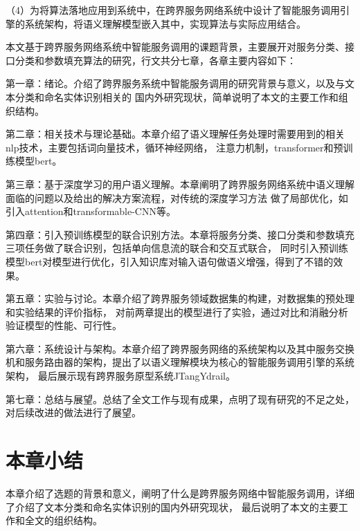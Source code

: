 （4）为将算法落地应用到系统中，在跨界服务网络系统中设计了智能服务调用引擎的系统架构，将语义理解模型嵌入其中，实现算法与实际应用结合。

本文基于跨界服务网络系统中智能服务调用的课题背景，主要展开对服务分类、接口分类和参数填充算法的研究，行文共分七章，各章主要内容如下：

第一章：绪论。介绍了跨界服务系统中智能服务调用的研究背景与意义，以及与文本分类和命名实体识别相关的
国内外研究现状，简单说明了本文的主要工作和组织结构。

第二章：相关技术与理论基础。本章介绍了语义理解任务处理时需要用到的相关nlp技术，主要包括词向量技术，循环神经网络，
注意力机制，transformer和预训练模型bert。

第三章：基于深度学习的用户语义理解。本章阐明了跨界服务网络系统中语义理解面临的问题以及给出的解决方案流程，对传统的深度学习方法
做了局部优化，如引入attention和transformable-CNN等。

第四章：引入预训练模型的联合识别方法。本章将服务分类、接口分类和参数填充三项任务做了联合识别，包括单向信息流的联合和交互式联合，
同时引入预训练模型bert对模型进行优化，引入知识库对输入语句做语义增强，得到了不错的效果。

第五章：实验与讨论。本章介绍了跨界服务领域数据集的构建，对数据集的预处理和实验结果的评价指标，
对前两章提出的模型进行了实验，通过对比和消融分析验证模型的性能、可行性。

第六章：系统设计与架构。本章介绍了跨界服务网络的系统架构以及其中服务交换机和服务路由器的架构，提出了以语义理解模块为核心的智能服务调用引擎的系统架构，
最后展示现有跨界服务原型系统JTangYdrail。

第七章：总结与展望。总结了全文工作与现有成果，点明了现有研究的不足之处，对后续改进的做法进行了展望。

\section{本章小结}
本章介绍了选题的背景和意义，阐明了什么是跨界服务网络中智能服务调用，详细了介绍了文本分类和命名实体识别的国内外研究现状，
最后说明了本文的主要工作和全文的组织结构。
